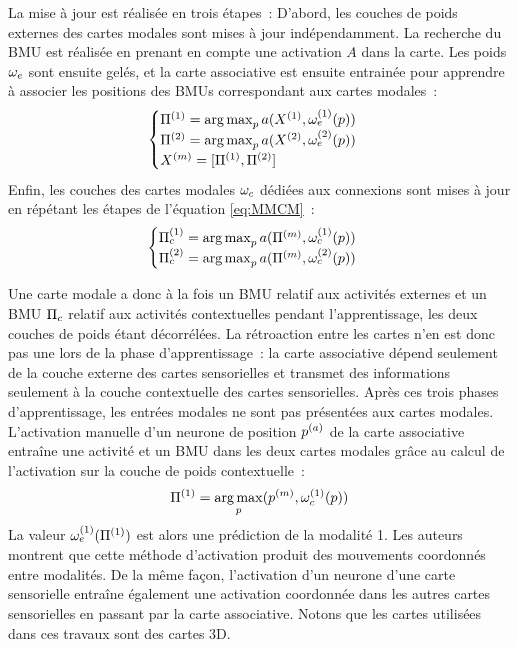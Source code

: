 \documentclass[../main]{subfiles}
\begin{document}
La mise à jour est réalisée en trois étapes~: 
D'abord, les couches de poids externes des cartes modales sont mises à jour indépendamment.
La recherche du BMU est réalisée en prenant en compte une activation $A$ dans la carte.
Les poids $\omega_e$ sont ensuite gelés, et la carte associative est ensuite entrainée pour apprendre à associer les positions des BMUs correspondant aux cartes modales~: 
\begin{equation}\label{eq:MMCM}
\begin{cases}
    \Pi^{({1})} = \operatorname*{arg\,max}_p a(X^{({1})}, \omega_e^{({1})}(p))\\
    \Pi^{({2})} = \operatorname*{arg\,max}_p a(X^{({2})}, \omega_e^{({2})}(p))\\
    X^{({m})} = [\Pi^{({1})}, \Pi^{({2})}]\\
\end{cases}
\end{equation}
Enfin, les couches des cartes modales $\omega_c$ dédiées aux connexions sont mises à jour en répétant les étapes de l'équation \ref{eq:MMCM}~:
\begin{equation}\label{eq:MMCM}
    \begin{cases}
        \Pi_c^{({1})} = \operatorname*{arg\,max}_p a(\Pi^{({m})}, \omega_c^{({1})}(p))\\
        \Pi_c^{({2})} = \operatorname*{arg\,max}_p a(\Pi^{({m})}, \omega_c^{({2})}(p))
    \end{cases}
    \end{equation}

Une carte modale a donc à la fois un BMU relatif aux activités externes et un BMU $\Pi_c$ relatif aux activités contextuelles pendant l'apprentissage, les deux couches de poids étant décorrélées.
La rétroaction entre les cartes n'en est donc pas une lors de la phase d'apprentissage~: la carte associative dépend seulement de la couche externe des cartes sensorielles et transmet des informations seulement à la couche contextuelle des cartes sensorielles.
Après ces trois phases d'apprentissage, les entrées modales ne sont pas présentées aux cartes modales. L'activation manuelle d'un neurone de position $p^{({a})}$ de la carte associative entraîne une activité et un BMU dans les deux cartes modales grâce au calcul de l'activation sur la couche de poids contextuelle~: 
$$ \Pi^{({1})} = \operatorname*{arg\,max}_p(p^{({m})},\omega_c^{({1})}(p))$$
La valeur $\omega_e^{({1})}(\Pi^{({1})})$ est alors une prédiction de la modalité 1.
Les auteurs montrent que cette méthode d'activation produit des mouvements coordonnés entre modalités.
De la même façon, l'activation d'un neurone d'une carte sensorielle entraîne également une activation coordonnée dans les autres cartes sensorielles en passant par la carte associative.
Notons que les cartes utilisées dans ces travaux sont des cartes 3D.
\end{document}
